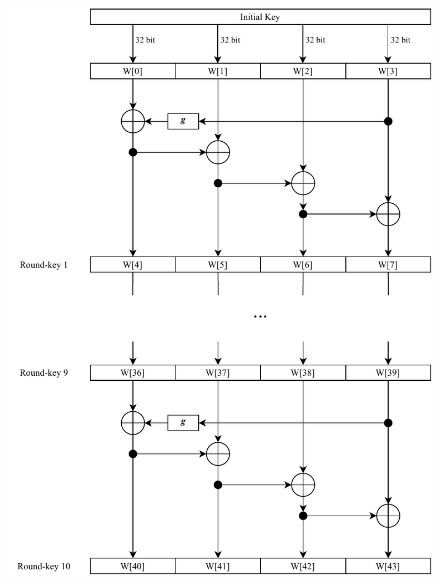\begin{figure}
\centering
  \begin{minipage}{.65\textwidth}
    \centering
    \includegraphics[width=\linewidth]{data/assets/key_expansion.pdf}
  \end{minipage}%
  \begin{minipage}{.35\textwidth}

\end{minipage}
\end{figure}
